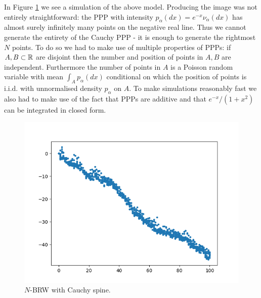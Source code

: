 \begin{remark}
In Figure \ref{fig:Cauchy_spine} we see a simulation of the above model. Producing the image was not entirely straightforward: the PPP with intensity $p_\alpha (dx) = e^{-x} \nu_\alpha (dx)$ has almost surely infinitely many points on the negative real line. Thus we cannot generate the entirety of the Cauchy PPP - it is enough to generate the rightmost $N$ points. To do so we had to make use of multiple properties of PPPs: if $A, B \subset \mathbb{R}$ are disjoint then the number and position of points in $A, B$ are independent. Furthermore the number of points in $A$ is a Poisson random variable with mean $\int_A p_\alpha(dx)$ conditional on which the position of points is i.i.d. with unnormalised density $p_\alpha$ on $A$. To make simulations reasonably fast we also had to make use of the fact that PPPs are additive and that $e^{-x}/(1+x^2)$ can be integrated in closed form.  
\end{remark}

\begin{figure}[!h]
  \centering
  \includegraphics[width=.99\linewidth]{graphics/cauchy_PPP}
  \caption{$N$-BRW with Cauchy spine. }
  \label{fig:Cauchy_spine}
\end{figure}


